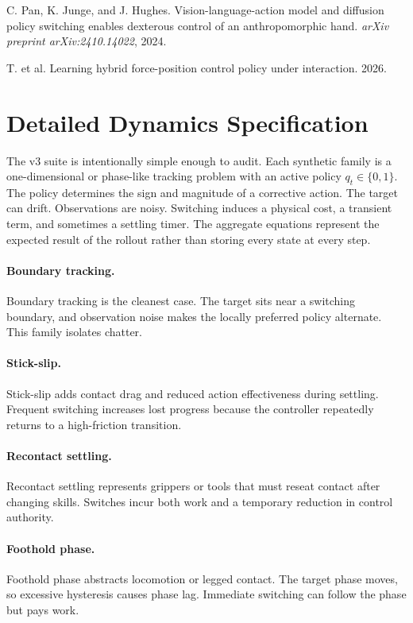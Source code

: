 \documentclass{article}
\newcommand{\mode}{q}
\begin{document}
C. Pan, K. Junge, and J. Hughes.
Vision-language-action model and diffusion policy switching enables dexterous control of an anthropomorphic hand.
\emph{arXiv preprint arXiv:2410.14022}, 2024.

T. et al.
Learning hybrid force-position control policy under interaction.
2026.

\appendix
\renewcommand{\thesection}{\arabic{section}}

\section{Detailed Dynamics Specification}

The v3 suite is intentionally simple enough to audit.
Each synthetic family is a one-dimensional or phase-like tracking problem with an active policy $\mode_t\in\{0,1\}$.
The policy determines the sign and magnitude of a corrective action.
The target can drift.
Observations are noisy.
Switching induces a physical cost, a transient term, and sometimes a settling timer.
The aggregate equations represent the expected result of the rollout rather than storing every state at every step.

\paragraph{Boundary tracking.}
Boundary tracking is the cleanest case.
The target sits near a switching boundary, and observation noise makes the locally preferred policy alternate.
This family isolates chatter.

\paragraph{Stick-slip.}
Stick-slip adds contact drag and reduced action effectiveness during settling.
Frequent switching increases lost progress because the controller repeatedly returns to a high-friction transition.

\paragraph{Recontact settling.}
Recontact settling represents grippers or tools that must reseat contact after changing skills.
Switches incur both work and a temporary reduction in control authority.

\paragraph{Foothold phase.}
Foothold phase abstracts locomotion or legged contact.
The target phase moves, so excessive hysteresis causes phase lag.
Immediate switching can follow the phase but pays work.
\end{document}
